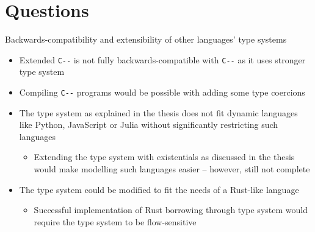 \documentclass[aspectratio=169]{beamer}
\def\cmm{\texttt{C-\relax-}}
\begin{document}
\section{Questions}

\begin{frame}{Backwards-compatibility and extensibility of other languages' type systems}
  \begin{itemize}
    \item Extended \cmm{} is not fully backwards-compatible with \cmm{} as it uses stronger type system
    \item Compiling \cmm{} programs would be possible with adding some type coercions
    \item The type system as explained in the thesis does not fit dynamic languages like Python, JavaScript or Julia without significantly restricting such languages
    \begin{itemize}
      \item Extending the type system with existentials as discussed in the thesis would make modelling such languages easier -- however, still not complete
    \end{itemize}
    \item The type system could be modified to fit the needs of a Rust-like language
    \begin{itemize}
      \item Successful implementation of Rust borrowing through type system would require the type system to be flow-sensitive
    \end{itemize}
  \end{itemize}
\end{frame}
\end{document}
